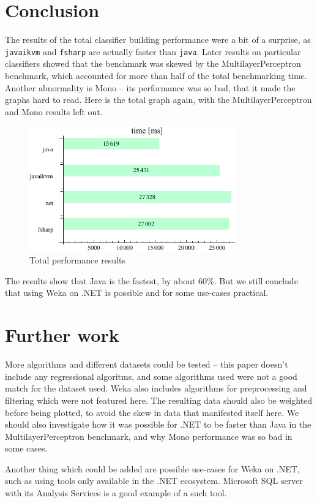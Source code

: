 \documentclass[journal]{IEEEtran/IEEEtran}
\newcommand\ver[1]{%
{\texttt{#1}}}
\begin{document}
\section{Conclusion}
The results of the total classifier building performance were a bit of a surprise, as \ver{javaikvm} and \ver{fsharp} are actually faster than \ver{java}. Later results on particular classifiers showed that the benchmark was skewed by the MultilayerPerceptron benchmark, which accounted for more than half of the total benchmarking time. Another abnormality is Mono -- its performance was so bad, that it made the graphs hard to read. Here is the total graph again, with the MultilayerPerceptron and Mono results left out.
\begin{figure}[H]
\centering
\includegraphics[width=3.5in]{TotalTotal}
\caption{Total performance results}
\end{figure}

The results show that Java is the fastest, by about 60\%. But we still conclude that using Weka on .NET is possible and for some use-cases practical.

\section{Further work}
More algorithms and different datasets could be tested -- this paper doesn't include any regressional algoritms, and some algorithms used were not a good match for the dataset used. Weka also includes algorithms for preprocessing and filtering which were not featured here. The resulting data should also be weighted before being plotted, to avoid the skew in data that manifested itself here. We should also investigate how it was possible for .NET to be faster than Java in the MultilayerPerceptron benchmark, and why Mono performance was so bad in some cases.

Another thing which could be added are possible use-cases for Weka on .NET, such as using tools only available in the .NET ecosystem. Microsoft SQL server with its Analysis Services is a good example of a such tool.
\end{document}
